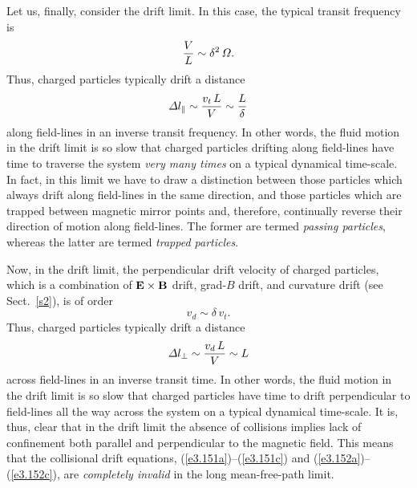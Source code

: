 Let us, finally, consider the drift limit. In this case, the typical
transit frequency is
\begin{equation}
\frac{V}{L} \sim \delta^2\,{\mit\Omega}.
\end{equation}
Thus, charged particles
typically drift a distance
\begin{equation}
{\mit\Delta} l_\parallel \sim \frac{v_t\,L}{V} \sim \frac{L}{\delta}
\end{equation}
along field-lines in an inverse transit frequency. In other
words, the fluid motion in the drift limit is so slow
that charged particles drifting along
field-lines have time to traverse the system {\em very many times}\/ on a typical
dynamical time-scale. In fact, in this limit we have to
draw a distinction between those particles which always drift along field-lines
in the same direction, and those  particles which are trapped between magnetic
mirror points and, therefore,  continually reverse their direction of motion
along field-lines. The former are termed {\em passing particles}, whereas
the latter are termed {\em trapped particles}. 

Now, in the drift limit, the  perpendicular drift velocity of
charged particles, which is a combination of ${\bf E}\times{\bf B}$ drift,
grad-$B$ drift, and curvature drift (see Sect.~\ref{s2}), is of order
\begin{equation}
v_d \sim \delta\,v_t.
\end{equation}
Thus, charged particles typically drift a distance
\begin{equation}
{\mit\Delta} l_\perp \sim \frac{v_d\,L}{V} \sim L
\end{equation}
across field-lines in an inverse transit time. In other words, the
fluid motion in the drift limit is so slow that charged particles
have time
to drift perpendicular to field-lines all the way across the system on a
typical dynamical time-scale. 
It is, thus, clear that in the drift limit the absence of collisions implies
lack of confinement both parallel and perpendicular to the magnetic
field. This means that the collisional drift equations, (\ref{e3.151a})--(\ref{e3.151c}) and
(\ref{e3.152a})--(\ref{e3.152c}), are {\em completely invalid}\/ in the long mean-free-path limit. 

